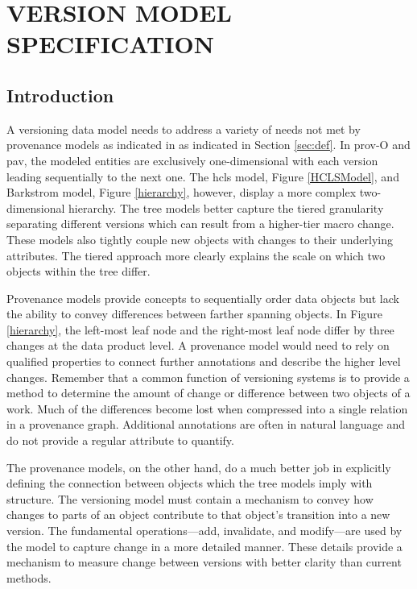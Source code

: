 

\chapter{VERSION MODEL SPECIFICATION}\label{ch:model}

\section{Introduction}

A versioning data model needs to address a variety of needs not met by provenance models as indicated in as indicated in Section \ref{sec:def}.
In \gls{prov}-O and \gls{pav}, the modeled entities are exclusively one-dimensional with each version leading sequentially to the next one.
The \gls{hcls} model, Figure \ref{HCLSModel}, and Barkstrom model, Figure \ref{hierarchy}, however, display a more complex two-dimensional hierarchy.
The tree models better capture the tiered granularity separating different versions which can result from a higher-tier macro change.
These models also tightly couple new objects with changes to their underlying attributes.
The tiered approach more clearly explains the scale on which two objects within the tree differ.

Provenance models provide concepts to sequentially order data objects but lack the ability to convey differences between farther spanning objects.
In Figure \ref{hierarchy}, the left-most leaf node and the right-most leaf node differ by three changes at the data product level.
A provenance model would need to rely on qualified properties to connect further annotations and describe the higher level changes.
Remember that a common function of versioning systems is to provide a method to determine the amount of change or difference between two objects of a work.
Much of the differences become lost when compressed into a single relation in a provenance graph.
Additional annotations are often in natural language and do not provide a regular attribute to quantify.

The provenance models, on the other hand, do a much better job in explicitly defining the connection between objects which the tree models imply with structure.
The versioning model must contain a mechanism to convey how changes to parts of an object contribute to that object's transition into a new version.
The fundamental operations---\gls{add}, \gls{invalidate}, and \gls{modify}---are used by the model to capture change in a more detailed manner.
These details provide a mechanism to measure change between versions with better clarity than current methods.

